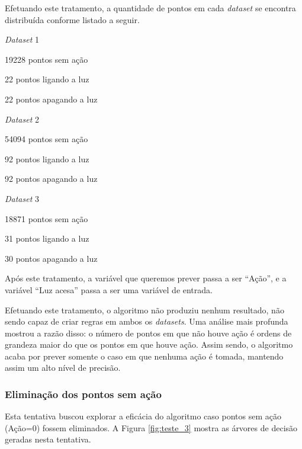 Efetuando este tratamento, a quantidade de pontos em cada \textit{dataset} se encontra distribuída conforme listado a seguir.

\begin{itemize_compact}
	\item \textit{Dataset} 1
	\begin{itemize_compact}
		\item 19228 pontos sem ação
		\item 22 pontos ligando a luz
		\item 22 pontos apagando a luz
	\end{itemize_compact}
		\item \textit{Dataset} 2
	\begin{itemize_compact}
		\item 54094 pontos sem ação
		\item 92 pontos ligando a luz
		\item 92 pontos apagando a luz
	\end{itemize_compact}
		\item \textit{Dataset} 3
	\begin{itemize_compact}
		\item 18871 pontos sem ação
		\item 31 pontos ligando a luz
		\item 30 pontos apagando a luz
	\end{itemize_compact}
\end{itemize_compact}

Após este tratamento, a variável que queremos prever passa a ser ``Ação'', e a variável ``Luz acesa'' passa a ser uma variável de entrada.

Efetuando este tratamento, o algoritmo não produziu nenhum resultado, não sendo capaz de criar regras em ambos os \textit{datasets}. Uma análise mais profunda mostrou a razão disso: o número de pontos em que não houve ação é ordens de grandeza maior do que os pontos em que houve ação. Assim sendo, o algoritmo acaba por prever somente o caso em que nenhuma ação é tomada, mantendo assim um alto nível de precisão. 

\subsubsection{Eliminação dos pontos sem ação} \label{subsubsec:elim_pts_sem_acao}
Esta tentativa buscou explorar a eficácia do algoritmo caso pontos sem ação (Ação=0) fossem eliminados. A Figura \ref{fig:teste_3} mostra as árvores de decisão geradas nesta tentativa.

